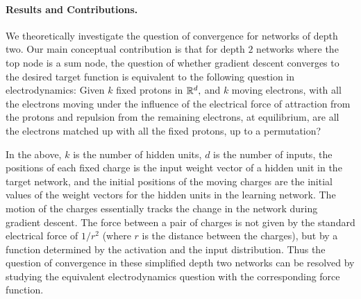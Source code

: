 \paragraph{Results and Contributions.} 
We theoretically investigate the question of convergence for networks of depth two.
Our main conceptual contribution is that for depth $2$ networks where the top node is a sum node, the question of whether gradient descent converges to the desired target function is equivalent to the following question in electrodynamics: Given $k$ fixed protons in $\mathbb R^d,$ and $k$ moving electrons,
with all the electrons moving under the influence of the 
electrical force of attraction from the protons and repulsion from the remaining electrons,
at equilibrium, are all the electrons matched up with all the fixed protons, up to a permutation?  

In the above, $k$ is the number of hidden units, $d$ is the number of inputs, the positions of each fixed charge is the input weight vector of
a hidden unit in the target network, and the initial positions of the moving charges are the initial values of the weight vectors for the hidden units in the learning network. The motion of the charges essentially tracks the change in the network during gradient descent. The force between a pair of charges is not given by the standard electrical force of $1/r^2$ (where $r$ is the distance between the charges), but by a function determined by the activation and the input distribution. Thus the question of convergence in these simplified depth two networks can be resolved by studying the equivalent electrodynamics question with the corresponding force function.
%

